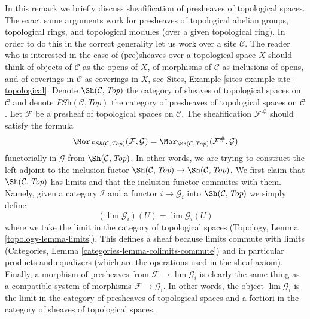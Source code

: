 \begin{remark}
\label{remark-sheafification-of-presheaves-in-top}
\begin{reference}
\cite{Gray}
\end{reference}
In this remark we briefly discuss sheafification of presheaves
of topological spaces. The exact same arguments work for
presheaves of topological abelian groups, topological rings, and
topological modules (over a given topological ring). In order to
do this in the correct generality let us work over a site
$\mathcal{C}$. The reader who is interested in the case of (pre)sheaves
over a topological space $X$ should think of objects of $\mathcal{C}$
as the opens of $X$, of morphisms of $\mathcal{C}$ as inclusions of
opens, and of coverings in $\mathcal{C}$ as coverings in $X$, see
Sites, Example \ref{sites-example-site-topological}.
Denote $\Sh(\mathcal{C}, \textit{Top})$ the category of sheaves
of topological spaces on $\mathcal{C}$ and denote
$\textit{PSh}(\mathcal{C}, \textit{Top})$ the category of presheaves
of topological spaces on $\mathcal{C}$.
Let $\mathcal{F}$ be a presheaf of topological spaces on $\mathcal{C}$.
The sheafification $\mathcal{F}^\#$ should satisfy the formula
$$
\Mor_{\textit{PSh}(\mathcal{C}, \textit{Top})}(\mathcal{F}, \mathcal{G})
=
\Mor_{\Sh(\mathcal{C}, \textit{Top})}(\mathcal{F}^\#, \mathcal{G})
$$
functorially in $\mathcal{G}$ from $\Sh(\mathcal{C}, \textit{Top})$.
In other words, we are trying to construct the left adjoint
to the inclusion fuctor
$\Sh(\mathcal{C}, \textit{Top}) \to \Sh(\mathcal{C}, \textit{Top})$.
We first claim that $\Sh(\mathcal{C}, \textit{Top})$ has limits
and that the inclusion functor commutes with them.
Namely, given a category $\mathcal{I}$ and a functor
$i \mapsto \mathcal{G}_i$ into $\Sh(\mathcal{C}, \textit{Top})$
we simply define
$$
(\lim \mathcal{G}_i)(U) = \lim \mathcal{G}_i(U)
$$
where we take the limit in the category of topological spaces
(Topology, Lemma \ref{topology-lemma-limits}). This defines a sheaf
because limits commute with limits
(Categories, Lemma \ref{categories-lemma-colimits-commute})
and in particular products and equalizers (which are the
operations used in the sheaf axiom). Finally, a morphism
of presheaves from $\mathcal{F} \to \lim \mathcal{G}_i$ is
clearly the same thing as a compatible system of morphisms
$\mathcal{F} \to \mathcal{G}_i$. In other words, the object
$\lim \mathcal{G}_i$ is the limit in the category
of presheaves of topological spaces and a fortiori in the
category of sheaves of topological spaces.

\end{remark}
